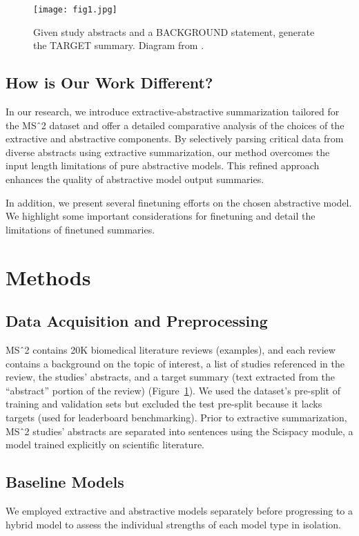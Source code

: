 \documentclass[11pt]{article}
\begin{document}
\begin{figure}[h]
  \centering
  \texttt{[image: fig1.jpg]}
  \caption{Given study abstracts and a BACKGROUND statement, generate the TARGET summary. Diagram from \cite{deyoung2021ms2}.}
  \label{fig:ms2-explainer}
\end{figure}
\vspace{-15pt} %

\subsection{How is Our Work Different?}

In our research, we introduce extractive-abstractive summarization tailored for the MSˆ2 dataset and offer a detailed comparative analysis of the choices of the extractive and abstractive components. By selectively parsing critical data from diverse abstracts using extractive summarization, our method overcomes the input length limitations of pure abstractive models. This refined approach enhances the quality of abstractive model output summaries.

In addition, we present several finetuning efforts on the chosen abstractive model. We highlight some important considerations for finetuning and detail the limitations of finetuned summaries.


\section{Methods}

\subsection{Data Acquisition and Preprocessing}

MSˆ2 contains 20K biomedical literature reviews (examples), and each review contains a background on the topic of interest, a list of studies referenced in the review, the studies’ abstracts, and a target summary (text extracted from the “abstract” portion of the review) (Figure~\ref{fig:ms2-explainer}). We used the dataset’s pre-split of training and validation sets but excluded the test pre-split because it lacks targets (used for leaderboard benchmarking). Prior to extractive summarization, MSˆ2 studies’ abstracts are separated into sentences using the Scispacy module, a model trained explicitly on scientific literature.


\subsection{Baseline Models}
We employed extractive and abstractive models separately before progressing to a hybrid model to assess the individual strengths of each model type in isolation.
\end{document}
